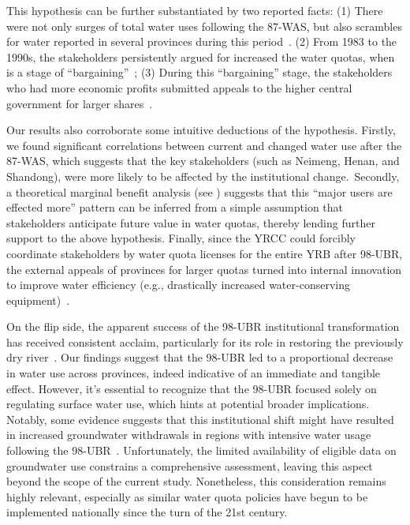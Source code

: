 This hypothesis can be further substantiated by two reported facts:
(1) There were not only surges of total water uses following the 87-WAS, but also scrambles for water reported in several provinces during this period~\cite{mao2000, bouckaert2022}.
(2) From 1983 to the 1990s, the stakeholders persistently argued for increased the water quotas, when is a stage of ``bargaining''~\cite{wang2019e, wang2019d};
(3) During this ``bargaining'' stage, the stakeholders who had more economic profits submitted appeals to the higher central government for larger shares~\cite{wang2019e, wang2019d}.

Our results also corroborate some intuitive deductions of the hypothesis.
Firstly, we found significant correlations between current and changed water use after the 87-WAS, which suggests that the key stakeholders (such as Neimeng, Henan, and Shandong), were more likely to be affected by the institutional change.\
Secondly, a theoretical marginal benefit analysis (see \textit{}) suggests that this ``major users are effected more'' pattern can be inferred from a simple assumption that stakeholders anticipate future value in water quotas, thereby lending further support to the above hypothesis.
Finally, since the YRCC could forcibly coordinate stakeholders by water quota licenses for the entire YRB after 98-UBR, the external appeals of provinces for larger quotas turned into internal innovation to improve water efficiency (e.g., drastically increased water-conserving equipment)~\cite{krieger1955, ostrom1990}.

On the flip side, the apparent success of the 98-UBR institutional transformation has received consistent acclaim, particularly for its role in restoring the previously dry river~\cite{wang2019e, wang2019d}.
Our findings suggest that the 98-UBR led to a proportional decrease in water use across provinces, indeed indicative of an immediate and tangible effect.
However, it's essential to recognize that the 98-UBR focused solely on regulating surface water use, which hints at potential broader implications.
Notably, some evidence suggests that this institutional shift might have resulted in increased groundwater withdrawals in regions with intensive water usage following the 98-UBR~\cite{sun2022b}.
Unfortunately, the limited availability of eligible data on groundwater use constrains a comprehensive assessment, leaving this aspect beyond the scope of the current study.
Nonetheless, this consideration remains highly relevant, especially as similar water quota policies have begun to be implemented nationally since the turn of the 21st century.

